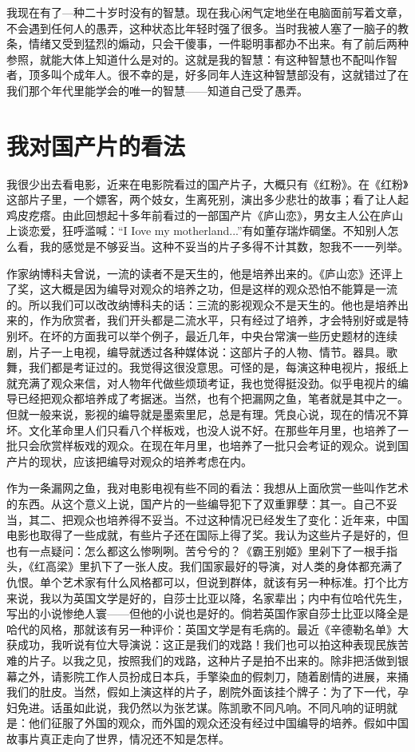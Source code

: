 我现在有了—种二十岁时没有的智慧。现在我心闲气定地坐在电脑面前写着文章，不会遇到任何人的愚弄，这种状态比年轻时强了很多。当时我被人塞了一脑子的教条，情绪又受到猛烈的煽动，只会干傻事，一件聪明事都办不出来。有了前后两种参照，就能大体上知道什么是对的。这就是我的智慧：有这种智慧也不配叫作智者，顶多叫个成年人。很不幸的是，好多同年人连这种智慧部没有，这就错过了在我们那个年代里能学会的唯一的智慧——知道自己受了愚弄。
 
\chapter{我对国产片的看法}

我很少出去看电影，近来在电影院看过的国产片子，大概只有《红粉》。在《红粉》这部片子里，一个嫖客，两个妓女，生离死别，演出多少悲壮的故事；看了让人起鸡皮疙瘩。由此回想起十多年前看过的一部国产片《庐山恋》，男女主人公在庐山上谈恋爱，狂呼滥喊：“I Iove my motherland...”有如董存瑞炸碉堡。不知别人怎么看，我的感觉是不够妥当。这种不妥当的片子多得不计其数，恕我不一一列举。　 

作家纳博科夫曾说，一流的读者不是天生的，他是培养出来的。《庐山恋》还评上了奖，这大概是因为编导对观众的培养之功，但是这样的观众恐怕不能算是一流的。所以我们可以改改纳博科夫的话：三流的影视观众不是天生的。他也是培养出来的，作为欣赏者，我们开头都是二流水平，只有经过了培养，才会特别好或是特别坏。在坏的方面我可以举个例子，最近几年，中央台常演一些历史题材的连续剧，片子一上电视，编导就透过各种媒体说：这部片子的人物、情节。器具。歌舞，我们都是考证过的。我觉得这很没意思。可怪的是，每演这种电视片，报纸上就充满了观众来信，对人物年代做些烦琐考证，我也觉得挺没劲。似乎电视片的编导已经把观众都培养成了考据迷。当然，也有个把漏网之鱼，笔者就是其中之一。但就一般来说，影视的编导就是墨索里尼，总是有理。凭良心说，现在的情况不算坏。文化革命里人们只看八个样板戏，也没人说不好。在那些年月里，也培养了一批只会欣赏样板戏的观众。在现在年月里，也培养了一批只会考证的观众。说到国产片的现状，应该把编导对观众的培养考虑在内。　 

作为一条漏网之鱼，我对电影电视有些不同的看法：我想从上面欣赏一些叫作艺术的东西。从这个意义上说，国产片的一些编导犯下了双重罪孽：其一。自己不妥当，其二、把观众也培养得不妥当。不过这种情况已经发生了变化：近年来，中国电影也取得了一些成就，有些片子还在国际上得了奖。我认为这些片子是好的，但也有一点疑问：怎么都这么惨咧咧。苦兮兮的？《霸王别姬》里剁下了一根手指头，《红高梁》里扒下了一张人皮。我们国家最好的导演，对人类的身体都充满了仇恨。单个艺术家有什么风格都可以，但说到群体，就该有另一种标准。打个比方来说，我以为英国文学是好的，自莎士比亚以降，名家辈出；内中有位哈代先生，写出的小说惨绝人寰——但他的小说也是好的。倘若英国作家自莎士比亚以降全是哈代的风格，那就该有另一种评价：英国文学是有毛病的。最近《辛德勒名单》大获成功，我听说有位大导演说：这正是我们的戏路！我们也可以拍这种表现民族苦难的片子。以我之见，按照我们的戏路，这种片子是拍不出来的。除非把活做到银幕之外，请影院工作人员扮成日本兵，手擎染血的假刺刀，随着剧情的进展，来捅我们的肚皮。当然，假如上演这样的片子，剧院外面该挂个牌子：为了下一代，孕妇免进。话虽如此说，我仍然以为张艺谋。陈凯歌不同凡响。不同凡响的证明就是：他们征服了外国的观众，而外国的观众还没有经过中国编导的培养。假如中国故事片真正走向了世界，情况还不知是怎样。　 

